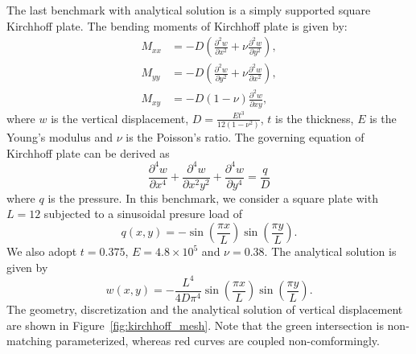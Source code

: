 The last benchmark with analytical solution is a simply supported square Kirchhoff plate. The bending moments of Kirchhoff plate is given by:
\begin{equation}
	\begin{split}
		M_{xx} &= -D\left( \frac{\partial^2 w}{\partial x^2} + \nu \frac{\partial^2 w}{\partial y^2}\right),\\
		M_{yy} &= -D\left( \frac{\partial^2 w}{\partial y^2} + \nu \frac{\partial^2 w}{\partial x^2}\right),\\
		M_{xy} &= -D(1-\nu) \frac{\partial^2 w}{\partial xy},
	\end{split}
\end{equation}
where $w$ is the vertical displacement, $D = \frac{Et^3}{12(1-\nu^2)}$, $t$ is the thickness, $E$ is the Young's modulus and $\nu$ is the Poisson's ratio. The governing equation of Kirchhoff plate can be derived as
\begin{equation}
	\frac{\partial^4 w}{\partial x^4} + \frac{\partial^4 w}{\partial x^2y^2} + \frac{\partial^4 w}{\partial y^4} = \frac{q}{D}
\end{equation}
where $q$ is the pressure. In this benchmark, we consider a square plate with $L=12$ subjected to a sinusoidal presure load of
\begin{equation}
	q(x,y) = -\sin(\frac{\pi x}{L}) \sin(\frac{\pi y}{L}).
\end{equation}
We also adopt $t=0.375$, $E=4.8\times 10^5$ and $\nu = 0.38$. The analytical solution is given by
\begin{equation}
	w(x, y) = -\frac{L^4}{4D\pi^4}\sin(\frac{\pi x}{L}) \sin(\frac{\pi y}{L}).
\end{equation}
The geometry, discretization and the analytical solution of vertical displacement are shown in Figure~\ref{fig:kirchhoff_mesh}. Note that the green intersection is non-matching parameterized, whereas red curves are coupled non-comformingly. \par

